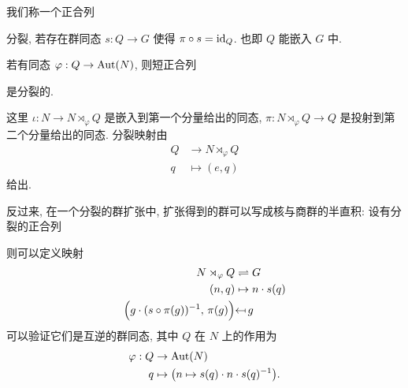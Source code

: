 \begin{remark}
        \begin{definition}[分裂的正合列]
            我们称一个正合列
            \begin{center}
            \end{center}
            分裂, 若存在群同态 $s:Q\rightarrow G$ 使得 $\pi\circ s={\rm id}_Q$. 也即 $Q$ 能嵌入 $G$ 中.
        \end{definition}
        \begin{remark}[群的半直积与分裂的正合列]
            若有同态 $\varphi:Q\rightarrow{\rm Aut}(N)$, 则短正合列
            \begin{center}
            \end{center}
            是分裂的. 
            
            这里 $\iota:N\rightarrow N\rtimes_{\varphi}Q$ 是嵌入到第一个分量给出的同态, $\pi:N\rtimes_{\varphi}Q\rightarrow Q$ 是投射到第二个分量给出的同态.
            分裂映射由
            \begin{align*}
                Q &\rightarrow N\rtimes_{\varphi}Q \\
                q &\mapsto(e,q)
            \end{align*}
            给出.

            反过来, 在一个分裂的群扩张中, 扩张得到的群可以写成核与商群的半直积: 设有分裂的正合列
            \begin{center}
            \end{center}
            则可以定义映射
            \begin{align*}
                N\rtimes_{\varphi}Q&\rightleftharpoons G \\
                (n,q)&\mapsto n\cdot s(q) \\
                \Big(g\cdot(s\circ\pi(g))^{-1},\,\pi(g)\Big)&\reflectbox{$\mapsto$}\,g
            \end{align*}
            可以验证它们是互逆的群同态, 其中 $Q$ 在 $N$ 上的作用为
            \begin{align*}
                \varphi: Q & \rightarrow{\rm Aut}(N) \\
                q & \mapsto\big(n\mapsto s(q)\cdot n\cdot s(q)^{-1}\big).
            \end{align*}
        \end{remark}
        

\end{remark}
